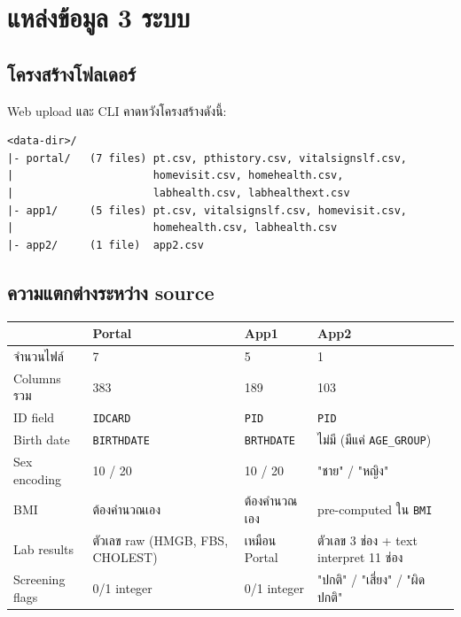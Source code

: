 \documentclass[11pt,a4paper]{article}
\begin{document}
\section{แหล่งข้อมูล 3 ระบบ}

\subsection{โครงสร้างโฟลเดอร์}

Web upload และ CLI คาดหวังโครงสร้างดังนี้:
\begin{lstlisting}[style=shellstyle]
<data-dir>/
|- portal/   (7 files) pt.csv, pthistory.csv, vitalsignslf.csv,
|                      homevisit.csv, homehealth.csv,
|                      labhealth.csv, labhealthext.csv
|- app1/     (5 files) pt.csv, vitalsignslf.csv, homevisit.csv,
|                      homehealth.csv, labhealth.csv
|- app2/     (1 file)  app2.csv
\end{lstlisting}

\subsection{ความแตกต่างระหว่าง source}

\begin{center}
\small
\begin{tabularx}{\linewidth}{l X X X}
\toprule
& \textbf{Portal} & \textbf{App1} & \textbf{App2} \\
\midrule
จำนวนไฟล์          & 7 & 5 & 1 \\
Columns รวม        & 383 & 189 & 103 \\
ID field           & \texttt{IDCARD} & \texttt{PID} & \texttt{PID} \\
Birth date         & \texttt{BIRTHDATE} & \texttt{BRTHDATE} & ไม่มี (มีแค่ \texttt{AGE\_GROUP}) \\
Sex encoding       & 10 / 20 & 10 / 20 & "ชาย" / "หญิง" \\
BMI                & ต้องคำนวณเอง & ต้องคำนวณเอง & pre-computed ใน \texttt{BMI} \\
Lab results        & ตัวเลข raw (HMGB, FBS, CHOLEST) & เหมือน Portal & ตัวเลข 3 ช่อง + text interpret 11 ช่อง \\
Screening flags    & 0/1 integer & 0/1 integer & "ปกติ" / "เสี่ยง" / "ผิดปกติ" \\
\bottomrule
\end{tabularx}
\end{center}
\end{document}
